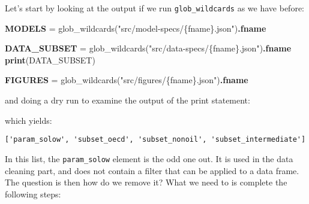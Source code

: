 \documentclass[]{book}
\newenvironment{Shaded}{\begin{snugshade}}{\end{snugshade}}
\newcommand{\KeywordTok}[1]{\textcolor[rgb]{0.13,0.29,0.53}{\textbf{{#1}}}}
\newcommand{\StringTok}[1]{\textcolor[rgb]{0.31,0.60,0.02}{{#1}}}
\newcommand{\NormalTok}[1]{{#1}}
\theoremstyle{definition}
\theoremstyle{definition}
\theoremstyle{definition}
\theoremstyle{remark}
\begin{document}
Let's start by looking at the output if we run \texttt{glob\_wildcards}
as we have before:

\begin{Shaded}
\begin{Highlighting}[]
\KeywordTok{MODELS} \NormalTok{= glob_wildcards(}\StringTok{"src/model-specs/\{fname\}.json"}\NormalTok{)}\KeywordTok{.fname}

\KeywordTok{DATA_SUBSET} \NormalTok{= glob_wildcards(}\StringTok{"src/data-specs/\{fname\}.json"}\NormalTok{)}\KeywordTok{.fname}
\KeywordTok{print}\NormalTok{(DATA_SUBSET)}

\KeywordTok{FIGURES} \NormalTok{= glob_wildcards(}\StringTok{"src/figures/\{fname\}.json"}\NormalTok{)}\KeywordTok{.fname}
\end{Highlighting}
\end{Shaded}

and doing a dry run to examine the output of the print statement:

\begin{Shaded}
\end{Shaded}

which yields:

\begin{verbatim}
['param_solow', 'subset_oecd', 'subset_nonoil', 'subset_intermediate']
\end{verbatim}

In this list, the \texttt{param\_solow} element is the odd one out. It
is used in the data cleaning part, and does not contain a filter that
can be applied to a data frame. The question is then how do we remove
it? What we need to is complete the following steps:
\end{document}
